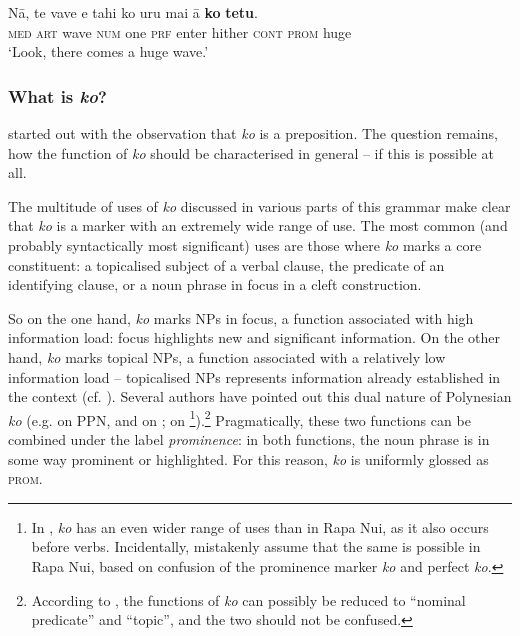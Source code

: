 \ea\label{ex:4.328}
\gll Nā, te vave e tahi ko uru mai {\ꞌ}ā \textbf{ko} \textbf{tetu}. \\
\textsc{med} \textsc{art} wave \textsc{num} one \textsc{prf} enter hither \textsc{cont} \textsc{prom} huge \\

\glt 
‘Look, there comes a huge wave.’ \textstyleExampleref{[R243.028]} 
\z

\subsubsection[What is ko?]{What is \textit{ko}?}\label{sec:4.7.11.4}

 started out with the observation that \textit{ko} is a preposition. The question remains, how the function of \textit{ko} should be characterised in general – if this is possible at all.

The multitude of uses of \textit{ko} discussed in various parts of this grammar make clear that \textit{ko} is a marker with an extremely wide range of use. The most common (and probably syntactically most significant) uses are those where \textit{ko} marks a core constituent: a topicalised subject of a verbal clause, the predicate of an identifying clause, or a noun phrase in focus in a cleft construction.

So on the one hand, \textit{ko} marks NPs in focus, a function associated with high information load: focus highlights new and significant information. On the other hand, \textit{ko} marks topical NPs, a function associated with a relatively low information load – topicalised NPs represents information already established in the context (cf. \citealt[51–52]{Levinsohn2007}). Several authors have pointed out this dual nature of Polynesian \textit{ko} (e.g. \citealt{Clark1976} on PPN, \citealt{Bauer1991} and \citealt{Pearce1999} on ; \citealt{MassamLee2006} on \footnote{\label{fn:244}In , \textit{ko} has an even wider range of uses than in Rapa Nui, as it also occurs before verbs. Incidentally, \citet[15]{MassamLee2006} mistakenly assume that the same is possible in Rapa Nui, based on confusion of the prominence marker \textit{ko} and perfect \textit{ko}.}).\footnote{\label{fn:245}According to \citet[46]{Clark1976}, the functions of \textit{ko} can possibly be reduced to “nominal predicate” and “topic”, and the two should not be confused.} Pragmatically, these two functions can be combined under the label \textit{prominence}: in both functions, the noun phrase is in some way prominent or highlighted. For this reason, \textit{ko} is uniformly glossed as \textsc{prom}.

